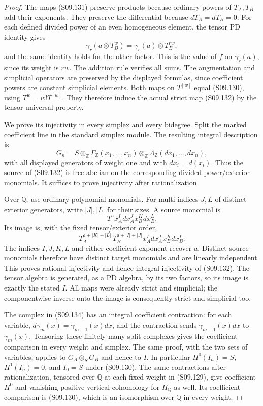 \begin{proof}
The maps (S09.131) preserve products because ordinary
powers of $T_A,T_B$ add their exponents.  They preserve
the differential because $dT_A=dT_B=0$.
For each defined divided power of an even homogeneous
element, the tensor PD identity gives
\[
 \gamma_r(a\otimes T_B^w)
       =\gamma_r(a)\otimes T_B^{rw},
 \tag{S09.133}
\]
and the same identity holds for the other factor.
This is the value of $f$ on $\gamma_r(a)$, since its
weight is $rw$.  The addition rule verifies all sums.
The augmentation and simplicial operators are preserved
by the displayed formulas, since coefficient powers
are constant simplicial elements.
Both maps on $T^{[w]}$ equal (S09.130), using
$T^w=w!T^{[w]}$.  They therefore induce the actual
strict map (S09.132) by the tensor universal property.

We prove its injectivity in every simplex and every
bidegree. Split the marked coefficient line in the
standard simplex module.  The resulting integral
description is
\[
 G_n=S\otimes_{\mathbb Z}
       \Gamma_{\mathbb Z}(x_1,\ldots,x_n)
       \otimes_{\mathbb Z}\Lambda_{\mathbb Z}
                              (dx_1,\ldots,dx_n),
 \tag{S09.134}
\]
with all displayed generators of weight one and with
$dx_i=d(x_i)$.  Thus the source of (S09.132) is free
abelian on the corresponding divided-power/exterior
monomials.  It suffices to prove injectivity after
rationalization.

Over $\mathbb Q$, use ordinary polynomial monomials.
For multi-indices $J,L$ of distinct exterior generators,
write $|J|,|L|$ for their sizes.  A source monomial is
\[
              T^a x_A^I dx_A^J x_B^K dx_B^L.
 \tag{S09.135}
\]
Its image is, with the fixed tensor/exterior order,
\[
 T_A^{a+|K|+|L|}\,T_B^{a+|I|+|J|}
                x_A^I dx_A^J x_B^K dx_B^L.
 \tag{S09.136}
\]
The indices $I,J,K,L$ and either coefficient exponent
recover $a$.  Distinct source monomials therefore have
distinct target monomials and are linearly independent.
This proves rational injectivity and hence integral
injectivity of (S09.132).  The tensor algebra is
generated, as a PD algebra, by its two factors, so its
image is exactly the stated $I$.  All maps were already
strict and simplicial; the componentwise inverse onto
the image is consequently strict and simplicial too.

The complex in (S09.134) has an integral coefficient
contraction: for each variable,
$d\gamma_m(x)=\gamma_{m-1}(x)dx$, and the contraction
sends $\gamma_{m-1}(x)dx$ to $\gamma_m(x)$.
Tensoring these finitely many split complexes gives
the coefficient comparison in every weight and simplex.
The same proof, with the two sets of variables, applies
to $G_A\otimes_SG_B$ and hence to $I$.
In particular $H^0(I_n)=S$, $H^1(I_n)=0$, and
$I_0=S$ under (S09.130).
The same contractions after rationalization, tensored
over $\mathbb Q$ at each fixed weight in (S09.129),
give coefficient $H^0$ and vanishing positive vertical
cohomology for $H_{\mathbb Q}$ as well.  Its coefficient
comparison is (S09.130), which is an isomorphism over
$\mathbb Q$ in every weight.


\end{proof}
